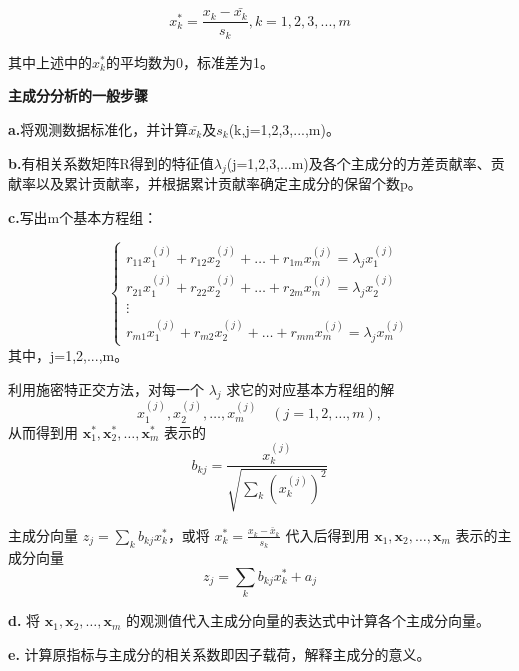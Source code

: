 \documentclass[withoutpreface,bwprint]{cumcmthesis}
\begin{document}
\[
x_{k}^{*} = \frac{x_{k}-\bar{x_{k}}}{s_{k}},k=1,2,3,...,m
\]

其中上述中的$x_{k}^{*}$的平均数为0，标准差为1。

\vspace{1em}
\textbf{主成分分析的一般步骤}

\textbf{a.}将观测数据标准化，并计算$\bar{x_{k}}$及$s_{k}$(k,j=1,2,3,...,m)。

\textbf{b.}有相关系数矩阵R得到的特征值$\lambda_{j}$(j=1,2,3,...m)及各个主成分的方差贡献率、贡献率以及累计贡献率，并根据累计贡献率确定主成分的保留个数p。

\textbf{c.}写出m个基本方程组：

   \[
    \begin{cases}
        r_{11} x_1^{(j)} + r_{12} x_2^{(j)} + \dots + r_{1m} x_m^{(j)} = \lambda_j x_1^{(j)} \\
        r_{21} x_1^{(j)} + r_{22} x_2^{(j)} + \dots + r_{2m} x_m^{(j)} = \lambda_j x_2^{(j)} \\
        \vdots \\
        r_{m1} x_1^{(j)} + r_{m2} x_2^{(j)} + \dots + r_{mm} x_m^{(j)} = \lambda_j x_m^{(j)}
    \end{cases}
    \]
其中，j=1,2,...,m。

利用施密特正交方法，对每一个 $\lambda_j$ 求它的对应基本方程组的解 
    \[
    x_1^{(j)}, x_2^{(j)}, \dots, x_m^{(j)} \quad (j = 1, 2, \dots, m),
    \]
    从而得到用 $\mathbf{x}_1^*, \mathbf{x}_2^*, \dots, \mathbf{x}_m^*$ 表示的
    \[
    b_{kj} = \frac{x_k^{(j)}}{\sqrt{\sum_k \left( x_k^{(j)} \right)^2}}
    \]

    主成分向量 $z_j = \sum_k b_{kj} x_k^*$，或将 $x_k^* = \frac{x_k - \bar{x}_k}{s_k}$ 代入后得到用 $\mathbf{x}_1, \mathbf{x}_2, \dots, \mathbf{x}_m$ 表示的主成分向量
    \[
    z_j = \sum_k b_{kj} x_k^* + a_j
    \]

\textbf{d.} 将 $\mathbf{x}_1, \mathbf{x}_2, \dots, \mathbf{x}_m$ 的观测值代入主成分向量的表达式中计算各个主成分向量。

\textbf{e.} 计算原指标与主成分的相关系数即因子载荷，解释主成分的意义。
\end{document}
